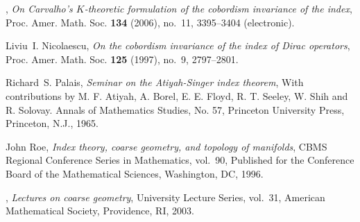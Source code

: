 \documentclass[a4paper]{amsproc}
\theoremstyle{definition}
\theoremstyle{remark}
\numberwithin{equation}{section}
\begin{document}
\begin{thebibliography}{10}
\bysame, \emph{On {C}arvalho's {$K$}-theoretic formulation of the cobordism
  invariance of the index}, Proc. Amer. Math. Soc. \textbf{134} (2006), no.~11,
  3395--3404 (electronic). 

Liviu~I. Nicolaescu, \emph{On the cobordism invariance of the index of {D}irac
  operators}, Proc. Amer. Math. Soc. \textbf{125} (1997), no.~9, 2797--2801.

Richard~S. Palais, \emph{Seminar on the {A}tiyah-{S}inger index theorem}, With
  contributions by M. F. Atiyah, A. Borel, E. E. Floyd, R. T. Seeley, W. Shih
  and R. Solovay. Annals of Mathematics Studies, No. 57, Princeton University
  Press, Princeton, N.J., 1965. 

John Roe, \emph{Index theory, coarse geometry, and topology of manifolds}, CBMS
  Regional Conference Series in Mathematics, vol.~90, Published for the
  Conference Board of the Mathematical Sciences, Washington, DC, 1996.

\bysame, \emph{Lectures on coarse geometry}, University Lecture Series,
  vol.~31, American Mathematical Society, Providence, RI, 2003. 

\end{thebibliography}
\end{document}
